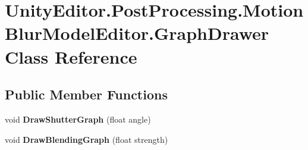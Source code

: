 \hypertarget{class_unity_editor_1_1_post_processing_1_1_motion_blur_model_editor_1_1_graph_drawer}{}\section{Unity\+Editor.\+Post\+Processing.\+Motion\+Blur\+Model\+Editor.\+Graph\+Drawer Class Reference}
\label{class_unity_editor_1_1_post_processing_1_1_motion_blur_model_editor_1_1_graph_drawer}
\subsection*{Public Member Functions}
\begin{DoxyCompactItemize}
\item 
\mbox{\label{class_unity_editor_1_1_post_processing_1_1_motion_blur_model_editor_1_1_graph_drawer_a310918df52daec4cca24d526c9dd85c8}} 
void {\bfseries Draw\+Shutter\+Graph} (float angle)
\item 
\mbox{\label{class_unity_editor_1_1_post_processing_1_1_motion_blur_model_editor_1_1_graph_drawer_a56ba4c2ab60eb19073707e2e433fec22}} 
void {\bfseries Draw\+Blending\+Graph} (float strength)
\end{DoxyCompactItemize}
